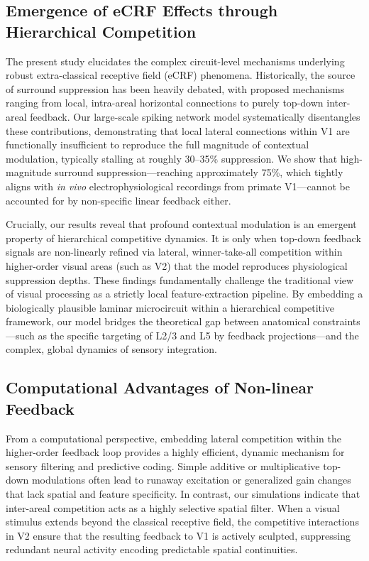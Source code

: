 \subsection{Emergence of eCRF Effects through Hierarchical Competition}
The present study elucidates the complex circuit-level mechanisms underlying robust extra-classical receptive field (eCRF) phenomena. Historically, the source of surround suppression has been heavily debated, with proposed mechanisms ranging from local, intra-areal horizontal connections to purely top-down inter-areal feedback. Our large-scale spiking network model systematically disentangles these contributions, demonstrating that local lateral connections within V1 are functionally insufficient to reproduce the full magnitude of contextual modulation, typically stalling at roughly 30--35\% suppression. We show that high-magnitude surround suppression—reaching approximately 75\%, which tightly aligns with \textit{in vivo} electrophysiological recordings from primate V1—cannot be accounted for by non-specific linear feedback either. 

Crucially, our results reveal that profound contextual modulation is an emergent property of hierarchical competitive dynamics. It is only when top-down feedback signals are non-linearly refined via lateral, winner-take-all competition within higher-order visual areas (such as V2) that the model reproduces physiological suppression depths. These findings fundamentally challenge the traditional view of visual processing as a strictly local feature-extraction pipeline. By embedding a biologically plausible laminar microcircuit within a hierarchical competitive framework, our model bridges the theoretical gap between anatomical constraints—such as the specific targeting of L2/3 and L5 by feedback projections—and the complex, global dynamics of sensory integration.

\subsection{Computational Advantages of Non-linear Feedback}
From a computational perspective, embedding lateral competition within the higher-order feedback loop provides a highly efficient, dynamic mechanism for sensory filtering and predictive coding. Simple additive or multiplicative top-down modulations often lead to runaway excitation or generalized gain changes that lack spatial and feature specificity. In contrast, our simulations indicate that inter-areal competition acts as a highly selective spatial filter. When a visual stimulus extends beyond the classical receptive field, the competitive interactions in V2 ensure that the resulting feedback to V1 is actively sculpted, suppressing redundant neural activity encoding predictable spatial continuities.

